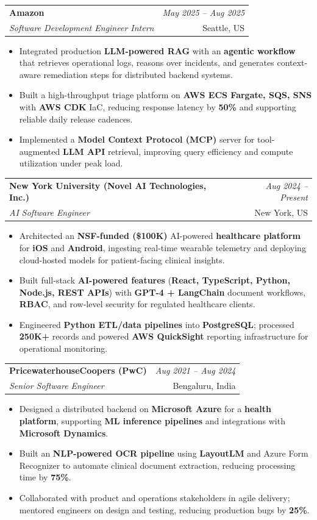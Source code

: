 \documentclass[a4paper,10pt]{article}
\makeatletter
\newcommand{\resumeSubheading}[4]{
\vspace{0.3mm}\item
    \begin{tabular*}{0.98\textwidth}[t]{l@{\extracolsep{\fill}}r}
        \textbf{#1} & \textit{\footnotesize{#4}} \\
        \textit{\footnotesize{#3}} & \footnotesize{#2}\\
    \end{tabular*}\vspace{-2mm}
}
\newcommand{\resumeItemListStart}{\begin{itemize}[leftmargin=*, labelsep=1mm, itemsep=0pt]}
\newcommand{\resumeItemListEnd}{\end{itemize}\vspace{-2mm}}
\makeatother
\begin{document}
\resumeSubheading
{Amazon}{Seattle, US}
{Software Development Engineer Intern}{May 2025 -- Aug 2025}
\resumeItemListStart
\item \footnotesize{Integrated production \textbf{LLM-powered RAG} with an \textbf{agentic workflow} that retrieves operational logs, reasons over incidents, and generates context-aware remediation steps for distributed backend systems.}
\item \footnotesize{Built a high-throughput triage platform on \textbf{AWS ECS Fargate, SQS, SNS} with \textbf{AWS CDK} IaC, reducing response latency by \textbf{50\%} and supporting reliable daily release cadences.}
\item \footnotesize{Implemented a \textbf{Model Context Protocol (MCP)} server for tool-augmented \textbf{LLM API} retrieval, improving query efficiency and compute utilization under peak load.}
\resumeItemListEnd

\resumeSubheading
{New York University (Novel AI Technologies, Inc.)}{New York, US}
{AI Software Engineer}{Aug 2024 -- Present}
\resumeItemListStart
\item \footnotesize{Architected an \textbf{NSF-funded (\$100K)} AI-powered \textbf{healthcare platform} for \textbf{iOS} and \textbf{Android}, ingesting real-time wearable telemetry and deploying cloud-hosted models for patient-facing clinical insights.}
\item \footnotesize{Built full-stack \textbf{AI-powered features} (\textbf{React, TypeScript, Python, Node.js, REST APIs}) with \textbf{GPT-4 + LangChain} document workflows, \textbf{RBAC}, and row-level security for regulated healthcare clients.}
\item \footnotesize{Engineered \textbf{Python ETL/data pipelines} into \textbf{PostgreSQL}; processed \textbf{250K+} records and powered \textbf{AWS QuickSight} reporting infrastructure for operational monitoring.}
\resumeItemListEnd

\resumeSubheading
{PricewaterhouseCoopers (PwC)}{Bengaluru, India}
{Senior Software Engineer}{Aug 2021 -- Aug 2024}
\resumeItemListStart
\item \footnotesize{Designed a distributed backend on \textbf{Microsoft Azure} for a \textbf{health platform}, supporting \textbf{ML inference pipelines} and integrations with \textbf{Microsoft Dynamics}.}
\item \footnotesize{Built an \textbf{NLP-powered OCR pipeline} using \textbf{LayoutLM} and Azure Form Recognizer to automate clinical document extraction, reducing processing time by \textbf{75\%}.}
\item \footnotesize{Collaborated with product and operations stakeholders in agile delivery; mentored engineers on design and testing, reducing production bugs by \textbf{25\%}.}
\resumeItemListEnd
\end{document}
